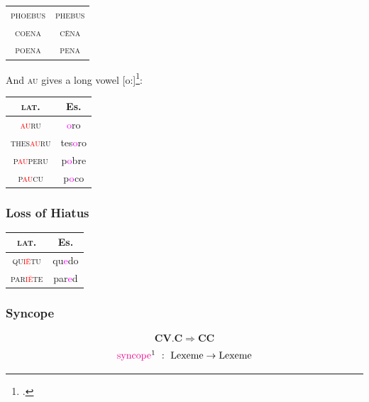 \documentclass{report}[12pt]
\begin{document}
\begin{center}
  \begin{tabular}{c c}
    \textsc{phoebus} & \textsc{phebus} \\
    \textsc{coena} & \textsc{c\={e}na} \\
    \textsc{poena} & \textsc{pena} \\ 
  \end{tabular}
\end{center}
And \textsc{au} gives a long vowel [o:]\footcite[p.~24]{romance_his}:
\begin{center}
\begin{tabular}{c c}
  \textsc{lat.} & Es. \\
  \hline
  \textsc{\textcolor{red}{au}ru} & \textcolor{magenta}{o}ro \\
  \textsc{thes\textcolor{red}{au}ru} & tes\textcolor{magenta}{o}ro \\
  \textsc{p\textcolor{red}{au}peru} & p\textcolor{magenta}{o}bre \\
  \textsc{p\textcolor{red}{au}cu} & p\textcolor{magenta}{o}co \\
\end{tabular}
\end{center}

\subsubsection{Loss of Hiatus}

\begin{tcolorbox}

\end{tcolorbox}

\begin{tabular}{c c}
  \textsc{lat.} & Es. \\
  \hline
  \textsc{qu\textcolor{red}{i\={e}}tu} & qu\textcolor{magenta}{e}do \\
  \textsc{par\textcolor{red}{i\u{e}}te} & par\textcolor{magenta}{e}d \\
\end{tabular}

\subsubsection{Syncope}

\begin{tcolorbox}
  \begin{align*}
    \textbf{C}\textbf{V}.\textbf{C} \Rightarrow \textbf{C}\textbf{C} 
  \end{align*}
  \tcblower
  \begin{align*}
    \text{\textcolor{magenta}{syncope}}\footnotemark &\ :\ \text{Lexeme} \rightarrow \text{Lexeme} \\
  \end{align*}
\end{tcolorbox}
\end{document}
